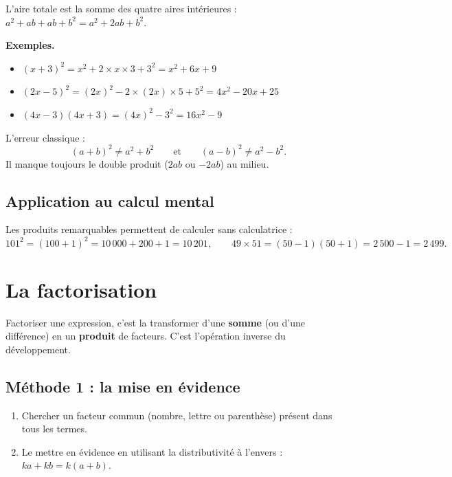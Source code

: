 \documentclass[../main.tex]{subfiles}
\begin{document}
L'aire totale est la somme des quatre aires intérieures : $a^2 + ab + ab + b^2 = a^2 + 2ab + b^2$.

\textbf{Exemples.}
\begin{itemize}
  \item $(x + 3)^2 = x^2 + 2 \times x \times 3 + 3^2 = x^2 + 6x + 9$
  \item $(2x - 5)^2 = (2x)^2 - 2 \times (2x) \times 5 + 5^2 = 4x^2 - 20x + 25$
  \item $(4x - 3)(4x + 3) = (4x)^2 - 3^2 = 16x^2 - 9$
\end{itemize}

\begin{attention}
L'erreur classique :
\[
(a + b)^2 \neq a^2 + b^2 \qquad\text{et}\qquad (a - b)^2 \neq a^2 - b^2.
\]
Il manque toujours le double produit ($2ab$ ou $-2ab$) au milieu.
\end{attention}

\subsection{Application au calcul mental}

Les produits remarquables permettent de calculer sans calculatrice :
\[
101^2 = (100+1)^2 = 10\,000 + 200 + 1 = 10\,201, \qquad
49 \times 51 = (50-1)(50+1) = 2\,500 - 1 = 2\,499.
\]

\section{La factorisation}

Factoriser une expression, c'est la transformer d'une \textbf{somme} (ou d'une différence) en un \textbf{produit} de facteurs. C'est l'opération inverse du développement.

\subsection{Méthode 1 : la mise en évidence}

\begin{methode}
\begin{enumerate}
  \item Chercher un facteur commun (nombre, lettre ou parenthèse) présent dans tous les termes.
  \item Le mettre en évidence en utilisant la distributivité à l'envers : $ka + kb = k(a + b)$.
\end{enumerate}
\end{methode}
\end{document}
